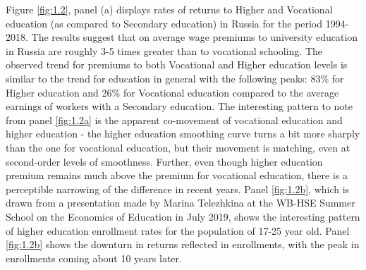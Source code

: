 \documentclass[12pt,a4paper]{article}
\numberwithin{equation}{section}
\begin{document}
Figure \ref{fig:1.2}, panel (a) displays rates of returns to Higher and Vocational education (as compared to Secondary education) in Russia for the period 1994-2018. The results suggest that on average wage premiums to university education in Russia are roughly 3-5 times greater than to vocational schooling. The observed trend for premiums to both Vocational and Higher education levels is similar to the trend for education in general with the following peaks: 83\% for Higher education and 26\% for Vocational education compared to the average earnings of workers with a Secondary education. The interesting pattern to note from panel \ref{fig:1.2a} is the apparent co-movement of vocational education and higher education - the higher education smoothing curve turns a bit more sharply than the one for vocational education, but their movement is matching, even at second-order levels of smoothness. Further, even though higher education premium remains much above the premium for vocational education, there is a perceptible narrowing of the difference in recent years. Panel \ref{fig:1.2b}, which is drawn from a presentation made by Marina Telezhkina at the WB-HSE Summer School on the Economics of Education in July 2019, shows the interesting pattern of higher education enrollment rates for the population of 17-25 year old. Panel \ref{fig:1.2b} shows the downturn in returns reflected in enrollments, with the peak in enrollments coming about 10 years later. 
\end{document}
